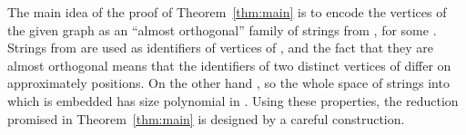 The main idea of the proof of Theorem~\ref{thm:main} is to encode the  vertices of the given graph  as an ``almost orthogonal'' family  of strings from , for some . Strings from  are used as identifiers of vertices of , and the fact that they are almost orthogonal means that the identifiers of two distinct vertices of  differ on approximately  positions. On the other hand , so the whole space of strings into which  is embedded has size polynomial in . Using these properties, the reduction promised in Theorem~\ref{thm:main} is designed by a careful construction.


